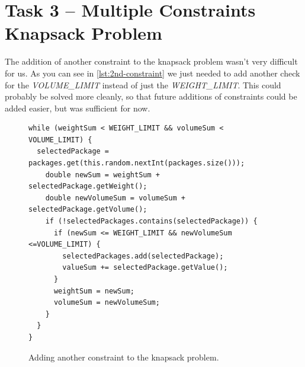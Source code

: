 \documentclass{scrartcl}
\begin{document}
\section{Task 3 -- Multiple Constraints Knapsack Problem}

The addition of another constraint to the knapsack problem wasn't very difficult for us. As you can see in \autoref{lst:2nd-constraint} we just needed to add another check for the \textit{VOLUME\_LIMIT} instead of just the \textit{WEIGHT\_LIMIT}. This could probably be solved more cleanly, so that future additions of constraints could be added easier, but was sufficient for now.


\begin{figure}
\caption{Adding another constraint to the knapsack problem.}
\label{lst:2nd-constraint}
\begin{lstlisting}
while (weightSum < WEIGHT_LIMIT && volumeSum < VOLUME_LIMIT) {
  selectedPackage = packages.get(this.random.nextInt(packages.size()));
    double newSum = weightSum + selectedPackage.getWeight();
    double newVolumeSum = volumeSum + selectedPackage.getVolume();
    if (!selectedPackages.contains(selectedPackage)) {
      if (newSum <= WEIGHT_LIMIT && newVolumeSum <=VOLUME_LIMIT) {
        selectedPackages.add(selectedPackage);
        valueSum += selectedPackage.getValue();
      }
      weightSum = newSum;
      volumeSum = newVolumeSum;
    }
  }
}
\end{lstlisting}
\end{figure}
\end{document}
